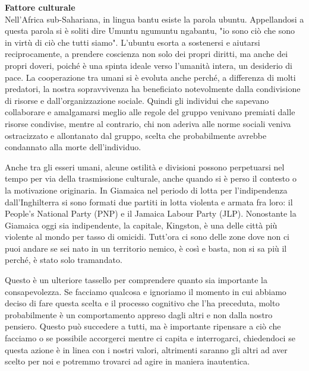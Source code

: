 \documentclass[12pt]{book} %
\begin{document}
\noindent \textbf{\large Fattore culturale} \\
Nell'Africa sub-Sahariana, in lingua bantu esiste la parola ubuntu. Appellandosi a questa parola si è soliti dire Umuntu
ngumuntu ngabantu, "io sono ciò che sono in virtù di ciò che tutti siamo". L'ubuntu esorta
a sostenersi e aiutarsi reciprocamente, a prendere coscienza non solo dei propri diritti, ma anche dei propri doveri,
poiché è una spinta ideale verso l'umanità intera, un desiderio di
pace. La cooperazione tra umani si è evoluta anche perché, a differenza di molti predatori, la nostra sopravvivenza ha beneficiato notevolmente dalla condivisione di risorse e dall’organizzazione sociale. 
Quindi gli individui che sapevano collaborare e amalgamarsi meglio alle regole
del gruppo venivano premiati dalle risorse condivise, mentre al contrario, chi non aderiva alle norme sociali veniva
ostracizzato e allontanato dal gruppo, scelta che probabilmente avrebbe condannato alla morte
dell'individuo. 

Anche tra gli esseri umani, alcune ostilità e divisioni possono perpetuarsi nel tempo per via della trasmissione culturale, anche quando si è perso il contesto o la motivazione originaria. In Giamaica nel periodo di lotta per
l'indipendenza dall'Inghilterra si sono formati due partiti in lotta violenta
e armata fra loro: il People's National Party (PNP) e il Jamaica Labour Party (JLP). Nonostante la Giamaica oggi sia
indipendente, la capitale, Kingston, è una delle città più violente al mondo per tasso di omicidi.
Tutt'ora ci sono delle zone dove non ci puoi andare se sei nato in un territorio nemico, è così e
basta, non si sa più il perché, è stato solo tramandato.

Questo è un ulteriore tassello per comprendere quanto sia importante la consapevolezza. Se facciamo qualcosa e ignoriamo
il momento in cui abbiamo deciso di fare questa scelta e il processo cognitivo che l'ha
preceduta, molto probabilmente è un comportamento appreso dagli altri e non dalla nostro pensiero. Questo può succedere a
tutti, ma è importante ripensare a ciò che facciamo o se possibile accorgerci mentre ci capita e interrogarci,
chiedendoci se questa azione è in linea con i nostri valori, altrimenti saranno gli altri ad aver scelto per noi e
potremmo trovarci ad agire in maniera inautentica.
\end{document}
